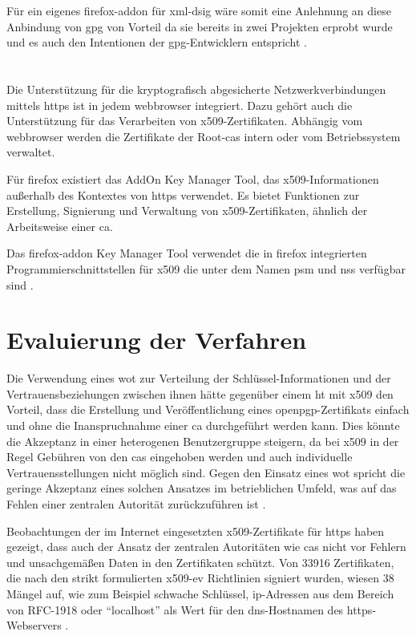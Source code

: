 Für ein eigenes \gls{firefox-addon} für \gls{xml-dsig} wäre somit eine Anlehnung an diese Anbindung von \gls{gpg} von Vorteil da sie bereits in zwei Projekten
erprobt wurde und es auch den Intentionen der \gls{gpg}-Entwicklern entspricht \cite{pgp}.

\section{}
\label{sec:Signaturverfahren:x509}
Die Unterstützung für die kryptografisch abgesicherte Netzwerkverbindungen mittels \gls{https} ist in jedem \gls{webbrowser} integriert. Dazu gehört auch die
Unterstützung für das Verarbeiten von \gls{x509}-Zertifikaten. Abhängig vom \gls{webbrowser} werden die Zertifikate der Root-\glspl{ca} intern oder vom
Betriebssystem verwaltet.

Für \gls{firefox} existiert das AddOn Key Manager Tool, das \gls{x509}-Informationen außerhalb des Kontextes von \gls{https} verwendet. Es bietet Funktionen zur
Erstellung, Signierung und Verwaltung von \gls{x509}-Zertifikaten, ähnlich der Arbeitsweise einer \gls{ca}. 

Das \gls{firefox-addon} Key  Manager Tool verwendet die in \gls{firefox} integrierten Programmierschnittstellen für \gls{x509} die unter dem Namen \gls{psm}
und \gls{nss} verfügbar sind \cite{key-manager-tool}. 

\section{Evaluierung der Verfahren}
Die Verwendung eines \gls{wot} zur Verteilung der Schlüssel-Informationen und der Vertrauensbeziehungen zwischen ihnen hätte gegenüber einem \gls{ht} mit
\gls{x509} den Vorteil, dass die Erstellung und Veröffentlichung eines \gls{openpgp}-Zertifikats einfach und ohne die Inanspruchnahme einer \gls{ca}
durchgeführt werden kann. Dies könnte die Akzeptanz in einer heterogenen Benutzergruppe steigern, da bei \gls{x509} in der Regel Gebühren von den \glspl{ca}
eingehoben werden und auch individuelle Vertrauensstellungen nicht möglich sind. Gegen den Einsatz eines \gls{wot} spricht die geringe Akzeptanz eines solchen
Ansatzes im betrieblichen Umfeld, was auf das Fehlen einer zentralen Autorität zurückzuführen ist \cite{krypto-pki-internet}.

Beobachtungen der im Internet eingesetzten \gls{x509}-Zertifikate für \gls{https} haben gezeigt, dass auch der Ansatz der zentralen Autoritäten wie \glspl{ca}
nicht vor Fehlern und unsachgemäßen Daten in den Zertifikaten schützt. Von 33916 Zertifikaten, die nach den strikt formulierten \gls{x509-ev} Richtlinien
\cite{ev-ssl} signiert wurden, wiesen 38 Mängel auf, wie zum Beispiel schwache Schlüssel, \gls{ip}-Adressen aus dem Bereich von RFC-1918 oder "`localhost"' als
Wert für den \gls{dns}-Hostnamen des \gls{https}-Webservers \cite{ssliverse:27c3}.

